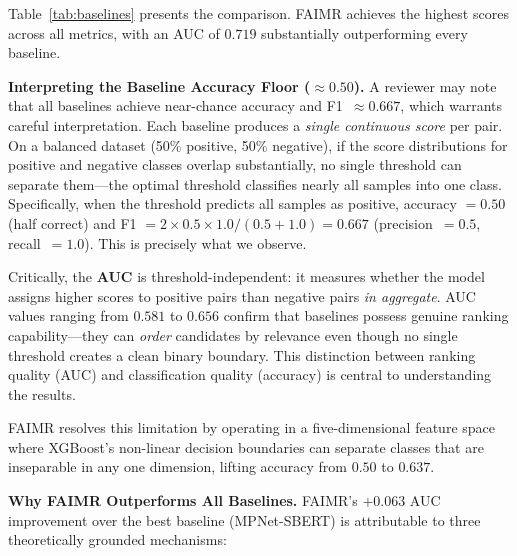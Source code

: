 \documentclass{llncs}
\begin{document}
Table~\ref{tab:baselines} presents the comparison. FAIMR achieves the highest scores across all metrics, with an AUC of $0.719$ substantially outperforming every baseline.

\textbf{Interpreting the Baseline Accuracy Floor ($\boldsymbol{\approx 0.50}$).} A reviewer may note that all baselines achieve near-chance accuracy and F1~$\approx 0.667$, which warrants careful interpretation. Each baseline produces a \textit{single continuous score} per pair. On a balanced dataset (50\% positive, 50\% negative), if the score distributions for positive and negative classes overlap substantially, no single threshold can separate them---the optimal threshold classifies nearly all samples into one class. Specifically, when the threshold predicts all samples as positive, accuracy $= 0.50$ (half correct) and F1 $= 2 \times 0.5 \times 1.0 / (0.5 + 1.0) = 0.667$ (precision~$= 0.5$, recall~$= 1.0$). This is precisely what we observe.

Critically, the \textbf{AUC} is threshold-independent: it measures whether the model assigns higher scores to positive pairs than negative pairs \textit{in aggregate}. AUC values ranging from $0.581$ to $0.656$ confirm that baselines possess genuine ranking capability---they can \textit{order} candidates by relevance even though no single threshold creates a clean binary boundary. This distinction between ranking quality (AUC) and classification quality (accuracy) is central to understanding the results.

FAIMR resolves this limitation by operating in a five-dimensional feature space where XGBoost's non-linear decision boundaries can separate classes that are inseparable in any one dimension, lifting accuracy from $0.50$ to $0.637$.

\textbf{Why FAIMR Outperforms All Baselines.} FAIMR's $+0.063$ AUC improvement over the best baseline (MPNet-SBERT) is attributable to three theoretically grounded mechanisms:
\end{document}
